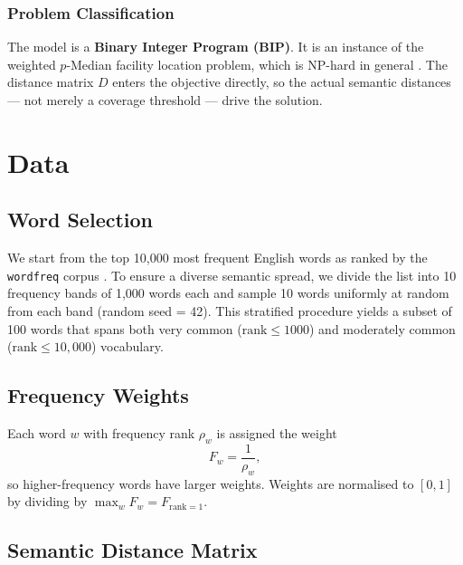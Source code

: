 \documentclass[11pt]{article}
\begin{document}
\subsubsection*{Problem Classification}

The model is a \textbf{Binary Integer Program (BIP)}.  It is an instance of the
weighted $p$-Median facility location problem, which is NP-hard in general
\citep{hochbaum1997}.
The distance matrix $D$ enters the objective directly, so the
actual semantic distances --- not merely a coverage threshold --- drive the solution.

\section{Data}\label{sec:data}

\subsection{Word Selection}

We start from the top 10{,}000 most frequent English words as ranked by the
\texttt{wordfreq} corpus \citep{speer2022}.
To ensure a diverse semantic spread, we divide the list into 10 frequency bands
of 1{,}000 words each and sample 10 words uniformly at random from each band
(random seed = 42). This stratified procedure yields a subset of 100 words that
spans both very common ($\text{rank} \leq 1000$) and moderately common
($\text{rank} \leq 10{,}000$) vocabulary.

\subsection{Frequency Weights}

Each word $w$ with frequency rank $\rho_w$ is assigned the weight
\begin{equation}
    F_w = \frac{1}{\rho_w},
    \label{eq:weight}
\end{equation}
so higher-frequency words have larger weights. Weights are normalised to
$[0,1]$ by dividing by $\max_w F_w = F_{\text{rank}=1}$.

\subsection{Semantic Distance Matrix}
\end{document}
